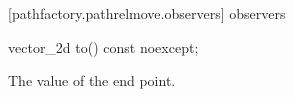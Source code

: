  [pathfactory.pathrelmove.observers]{ observers}

\begin{itemdecl}
    vector_2d to() const noexcept;
\end{itemdecl}
\begin{itemdescr}
	\pnum
	\returns
	The value of the end point.
\end{itemdescr}
